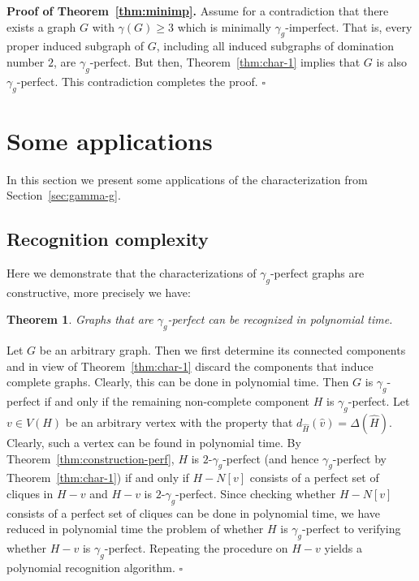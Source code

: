 \documentclass[12pt]{article}
\newtheorem{theorem}{Theorem}[section]
\newcommand{\proof}{\noindent{\bf Proof.\ }}
\newcommand{\qed}{\hfill $\square$ \bigskip}
\begin{document}
\noindent \textbf{Proof of Theorem~\ref{thm:minimp}.} Assume for a contradiction that there exists a graph $G$ with $\gamma(G)\ge 3$ which is minimally $\gamma_g$-imperfect. That is, every proper induced subgraph of $G$, including all induced subgraphs of domination number $2$, are $\gamma_g$-perfect. But then, Theorem~\ref{thm:char-1} implies that $G$ is also $\gamma_g$-perfect. This contradiction completes the proof. \qed

\section{Some applications}
\label{sec:appl}

In this section we present some applications of the characterization from Section~\ref{sec:gamma-g}.

\subsection{Recognition complexity}
\label{subsec:recognition}

Here we demonstrate that the characterizations of $\gamma_g$-perfect graphs are constructive, more precisely we have: 

\begin{theorem}
\label{thm:recognition}
Graphs that are $\gamma_g$-perfect can be recognized in polynomial time.
\end{theorem}

\proof
Let $G$ be an arbitrary graph. Then we first determine its connected components and in view of Theorem~\ref{thm:char-1} discard the components that induce complete graphs. Clearly, this can be done in polynomial time. Then $G$ is $\gamma_g$-perfect if and only if the remaining non-complete component $H$ is $\gamma_g$-perfect. Let $v\in V(H)$ be an arbitrary vertex with the property that $d_{\widehat{H}}(\widehat{v})=\Delta(\widehat{H})$. Clearly, such a vertex can be found in polynomial time. By Theorem~\ref{thm:construction-perf}, $H$ is $2$-$\gamma_g$-perfect (and hence $\gamma_g$-perfect by Theorem~\ref{thm:char-1}) if and only if $H-N[v]$ consists of a perfect set of cliques in $H-v$ and $H-v$ is $2$-$\gamma_g$-perfect. Since checking whether $H-N[v]$ consists of a perfect set of cliques can be done in polynomial time, we have reduced in polynomial time the problem of whether $H$ is $\gamma_g$-perfect to verifying whether $H-v$ is $\gamma_g$-perfect. Repeating the procedure on $H-v$ yields a polynomial recognition algorithm. 
\qed
\end{document}
